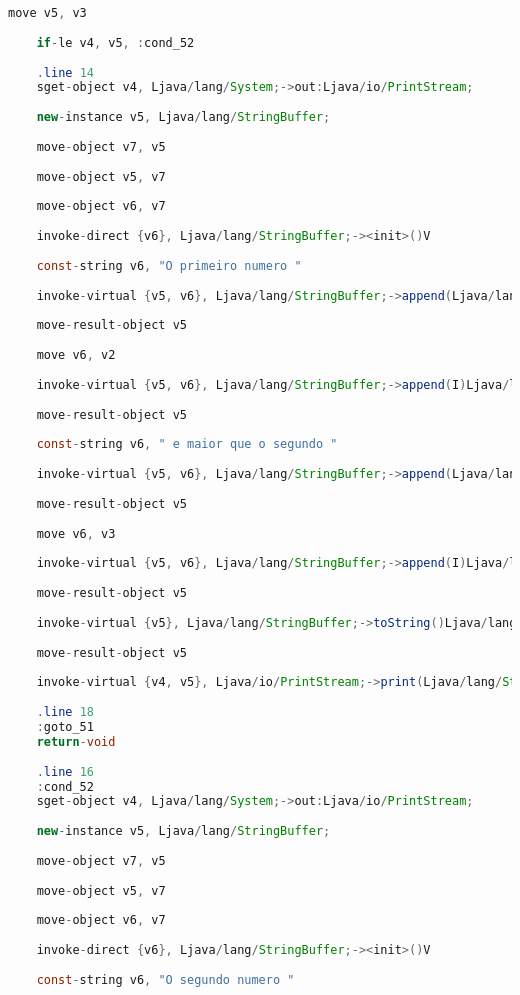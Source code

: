 \documentclass[hidelinks,12pt]{article}
\begin{document}
\begin{lstlisting}[caption=Smali resultante do .java,language=java]
	move v5, v3
	
	if-le v4, v5, :cond_52
	
	.line 14
	sget-object v4, Ljava/lang/System;->out:Ljava/io/PrintStream;
	
	new-instance v5, Ljava/lang/StringBuffer;
	
	move-object v7, v5
	
	move-object v5, v7
	
	move-object v6, v7
	
	invoke-direct {v6}, Ljava/lang/StringBuffer;-><init>()V
	
	const-string v6, "O primeiro numero "
	
	invoke-virtual {v5, v6}, Ljava/lang/StringBuffer;->append(Ljava/lang/String;)Ljava/lang/StringBuffer;
	
	move-result-object v5
	
	move v6, v2
	
	invoke-virtual {v5, v6}, Ljava/lang/StringBuffer;->append(I)Ljava/lang/StringBuffer;
	
	move-result-object v5
	
	const-string v6, " e maior que o segundo "
	
	invoke-virtual {v5, v6}, Ljava/lang/StringBuffer;->append(Ljava/lang/String;)Ljava/lang/StringBuffer;
	
	move-result-object v5
	
	move v6, v3
	
	invoke-virtual {v5, v6}, Ljava/lang/StringBuffer;->append(I)Ljava/lang/StringBuffer;
	
	move-result-object v5
	
	invoke-virtual {v5}, Ljava/lang/StringBuffer;->toString()Ljava/lang/String;
	
	move-result-object v5
	
	invoke-virtual {v4, v5}, Ljava/io/PrintStream;->print(Ljava/lang/String;)V
	
	.line 18
	:goto_51
	return-void
	
	.line 16
	:cond_52
	sget-object v4, Ljava/lang/System;->out:Ljava/io/PrintStream;
	
	new-instance v5, Ljava/lang/StringBuffer;
	
	move-object v7, v5
	
	move-object v5, v7
	
	move-object v6, v7
	
	invoke-direct {v6}, Ljava/lang/StringBuffer;-><init>()V
	
	const-string v6, "O segundo numero "
	

\end{lstlisting}
\end{document}

